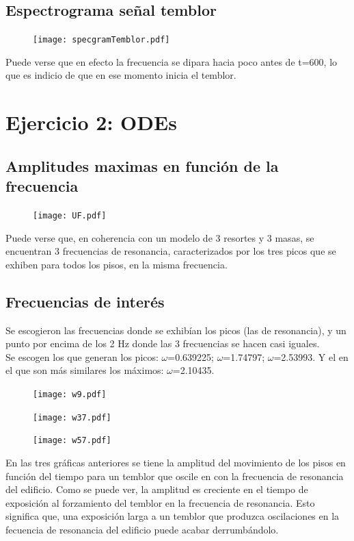 \documentclass[11pt,letterpaper]{exam}
\begin{document}
\subsection{Espectrograma señal temblor}
\begin{figure}[H]
\centering
\texttt{[image: specgramTemblor.pdf]}
\end{figure}
Puede verse que en efecto la frecuencia se dipara hacia poco antes de t=600, lo que es indicio de que en ese momento inicia el temblor.

\section{Ejercicio 2: ODEs}
\subsection{Amplitudes maximas en función de la frecuencia}
\begin{figure}[H]
\centering
\texttt{[image: UF.pdf]}
\end{figure}
Puede verse que, en coherencia con un modelo de 3 resortes y 3 masas, se encuentran 3 frecuencias de resonancia, caracterizados por los tres picos que se exhiben para todos los pisos, en la misma frecuencia. 

\subsection{Frecuencias de interés}
Se escogieron las frecuencias donde se exhibían los picos (las de resonancia), y un punto por encima de los 2 Hz donde las 3 frecuencias se hacen casi iguales.\\
Se escogen los que generan los picos: $\omega$=0.639225; $\omega$=1.74797;  $\omega$=2.53993. Y el en el que son más similares los máximos: $\omega$=2.10435.
\begin{figure}[H]
\centering
\texttt{[image: w9.pdf]}
\end{figure}

\begin{figure}[H]
\centering
\texttt{[image: w37.pdf]}
\end{figure}

\begin{figure}[H]
\centering
\texttt{[image: w57.pdf]}
\end{figure}

En las tres gráficas anteriores se tiene la amplitud del movimiento de los pisos en función del tiempo para un temblor que oscile en con la frecuencia de resonancia del edificio. Como se puede ver, la amplitud es creciente en el tiempo de exposición al forzamiento del temblor en la frecuencia de resonancia. Esto significa que, una exposición larga a un temblor que produzca oscilaciones en la fecuencia de resonancia del edificio puede acabar derrumbándolo.
\end{document}
